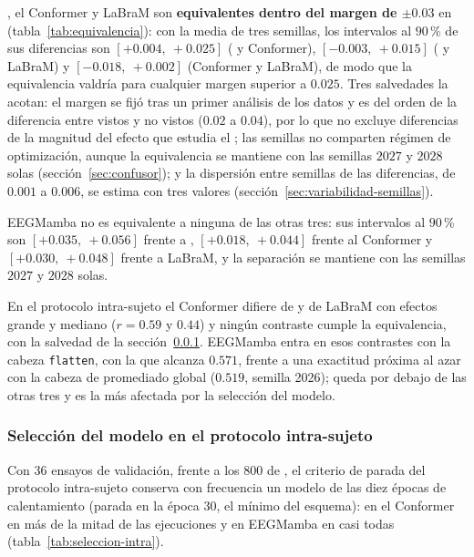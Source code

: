 \eegnet{}, el Conformer y LaBraM son \textbf{equivalentes dentro del margen de $\pm 0.03$} en
\loso{} (tabla~\ref{tab:equivalencia}): con la media de tres semillas, los intervalos al $90$\,\% de
sus diferencias son $[+0.004,\ +0.025]$ (\eegnet{} y Conformer), $[-0.003,\ +0.015]$ (\eegnet{} y
LaBraM) y $[-0.018,\ +0.002]$ (Conformer y LaBraM), de modo que la equivalencia valdría para cualquier
margen superior a $0.025$. Tres salvedades la acotan: el margen se fijó tras un primer análisis de los
datos y es del orden de la diferencia entre vistos y no vistos ($0.02$ a $0.04$), por lo que no excluye
diferencias de la magnitud del efecto que estudia el \dsi{}; las semillas no comparten régimen de
optimización, aunque la equivalencia se mantiene con las semillas $2027$ y $2028$ solas
(sección~\ref{sec:confusor}); y la dispersión entre semillas de las diferencias, de $0.001$ a $0.006$,
se estima con tres valores (sección~\ref{sec:variabilidad-semillas}).

EEGMamba no es equivalente a ninguna de las otras tres: sus intervalos al $90$\,\% son
$[+0.035,\ +0.056]$ frente a \eegnet{}, $[+0.018,\ +0.044]$ frente al Conformer y
$[+0.030,\ +0.048]$ frente a LaBraM, y la separación se mantiene con las semillas $2027$ y $2028$ solas.

En el protocolo intra-sujeto el Conformer difiere de \eegnet{} y de LaBraM con efectos grande y mediano
($r = 0.59$ y $0.44$) y ningún contraste cumple la equivalencia, con la salvedad de la
sección~\ref{sec:seleccion-intra}. EEGMamba entra en esos contrastes con la cabeza \texttt{flatten},
con la que alcanza $0.571$, frente a una exactitud próxima al azar con la cabeza de promediado global
($0.519$, semilla 2026); queda por debajo de las otras tres y es la más afectada por la selección del
modelo.

\subsubsection{Selección del modelo en el protocolo intra-sujeto}
\label{sec:seleccion-intra}

Con $36$ ensayos de validación, frente a los $800$ de \loso{}, el criterio de parada del protocolo
intra-sujeto conserva con frecuencia un modelo de las diez épocas de calentamiento (parada en la
época $30$, el mínimo del esquema): en el Conformer en más de la mitad de las ejecuciones y en
EEGMamba en casi todas (tabla~\ref{tab:seleccion-intra}).

